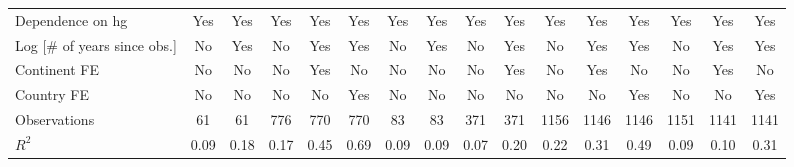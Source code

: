 {\begin{tabular}{l*{15}{c}}
\addlinespace
Dependence on hg&      Yes         &      Yes         &      Yes         &      Yes         &      Yes         &      Yes         &      Yes         &      Yes         &      Yes         &      Yes         &      Yes         &      Yes         &      Yes         &      Yes         &      Yes         \\
\addlinespace
Log [\# of years since obs.]&       No         &      Yes         &       No         &      Yes         &      Yes         &       No         &      Yes         &       No         &      Yes         &       No         &      Yes         &      Yes         &       No         &      Yes         &      Yes         \\
\addlinespace
Continent FE    &       No         &       No         &       No         &      Yes         &       No         &       No         &       No         &       No         &      Yes         &       No         &      Yes         &       No         &       No         &      Yes         &       No         \\
\addlinespace
Country FE      &       No         &       No         &       No         &       No         &      Yes         &       No         &       No         &       No         &       No         &       No         &       No         &      Yes         &       No         &       No         &      Yes         \\
\midrule
Observations    &       61         &       61         &      776         &      770         &      770         &       83         &       83         &      371         &      371         &     1156         &     1146         &     1146         &     1151         &     1141         &     1141         \\
\(R^{2}\)       &     0.09         &     0.18         &     0.17         &     0.45         &     0.69         &     0.09         &     0.09         &     0.07         &     0.20         &     0.22         &     0.31         &     0.49         &     0.09         &     0.10         &     0.31         \\
\bottomrule
\end{tabular}
}
